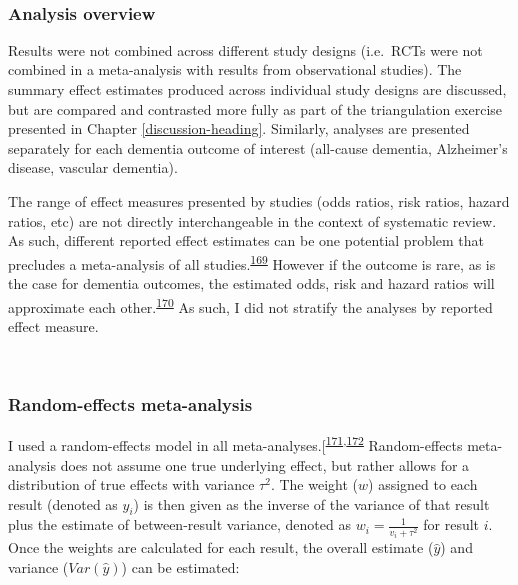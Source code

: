 \documentclass[a4paper, twoside]{templates/ociamthesis}
\begin{document}
~

\hypertarget{analysis-overview}{%
\subsubsection{Analysis overview}\label{analysis-overview}}

Results were not combined across different study designs (i.e.~RCTs were not combined in a meta-analysis with results from observational studies). The summary effect estimates produced across individual study designs are discussed, but are compared and contrasted more fully as part of the triangulation exercise presented in Chapter \ref{discussion-heading}. Similarly, analyses are presented separately for each dementia outcome of interest (all-cause dementia, Alzheimer's disease, vascular dementia).

The range of effect measures presented by studies (odds ratios, risk ratios, hazard ratios, etc) are not directly interchangeable in the context of systematic review. As such, different reported effect estimates can be one potential problem that precludes a meta-analysis of all studies.\textsuperscript{\protect\hyperlink{ref-mckenzie2019}{169}} However if the outcome is rare, as is the case for dementia outcomes, the estimated odds, risk and hazard ratios will approximate each other.\textsuperscript{\protect\hyperlink{ref-vanderweele2020}{170}} As such, I did not stratify the analyses by reported effect measure.

~

\hypertarget{random-effects-meta-analysis}{%
\subsubsection{Random-effects meta-analysis}\label{random-effects-meta-analysis}}

I used a random-effects model in all meta-analyses.{[}\textsuperscript{\protect\hyperlink{ref-hedges1998}{171},\protect\hyperlink{ref-dersimonian1986}{172}} Random-effects meta-analysis does not assume one true underlying effect, but rather allows for a distribution of true effects with variance \(\tau^2\). The weight (\(w\)) assigned to each result (denoted as \(y_i\)) is then given as the inverse of the variance of that result plus the estimate of between-result variance, denoted as \(w_i = \frac{1}{v_i+\tau^2}\) for result \(i\). Once the weights are calculated for each result, the overall estimate (\(\hat{y}\)) and variance (\(Var(\hat{y})\)) can be estimated:
\end{document}
